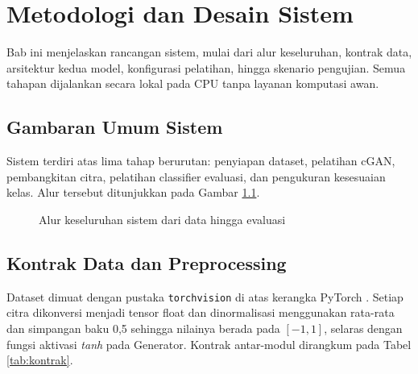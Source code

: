 \chapter{Metodologi dan Desain Sistem}

Bab ini menjelaskan rancangan sistem, mulai dari alur keseluruhan, kontrak data, arsitektur kedua model, konfigurasi pelatihan, hingga skenario pengujian. Semua tahapan dijalankan secara lokal pada CPU tanpa layanan komputasi awan.

\section{Gambaran Umum Sistem}

Sistem terdiri atas lima tahap berurutan: penyiapan dataset, pelatihan cGAN, pembangkitan citra, pelatihan classifier evaluasi, dan pengukuran kesesuaian kelas. Alur tersebut ditunjukkan pada Gambar \ref{fig:alur}.

\begin{figure}[H]
\centering
{}
\caption{Alur keseluruhan sistem dari data hingga evaluasi}
\label{fig:alur}
\end{figure}

\section{Kontrak Data dan Preprocessing}

Dataset dimuat dengan pustaka \texttt{torchvision} di atas kerangka PyTorch \citep{paszke2019pytorch}. Setiap citra dikonversi menjadi tensor float dan dinormalisasi menggunakan rata-rata dan simpangan baku 0,5 sehingga nilainya berada pada $[-1,1]$, selaras dengan fungsi aktivasi \textit{tanh} pada Generator. Kontrak antar-modul dirangkum pada Tabel \ref{tab:kontrak}.

